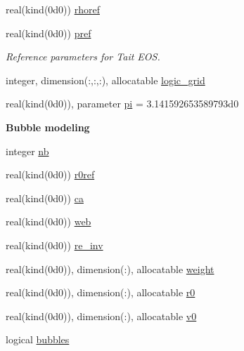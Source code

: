 \begin{DoxyCompactItemize}
real(kind(0d0)) \hyperlink{namespacem__global__parameters_a485a360d73013d7bce1daa01df404534}{rhoref}
\item 
real(kind(0d0)) \hyperlink{namespacem__global__parameters_aae2170af8a68c7dcdd91910aad867ef4}{pref}
\begin{DoxyCompactList}\small\item\em Reference parameters for Tait E\+OS. \end{DoxyCompactList}\item 
integer, dimension(\+:,\+:,\+:), allocatable \hyperlink{namespacem__global__parameters_adfaf902b37292b91750274e26989e8e6}{logic\+\_\+grid}
\item 
real(kind(0d0)), parameter \hyperlink{namespacem__global__parameters_a21765a90c01d221524670d1344b126cd}{pi} = 3.\+141592653589793d0
\end{DoxyCompactItemize}
\begin{Indent}\textbf{ Bubble modeling}\par
\begin{DoxyCompactItemize}
\item 
integer \hyperlink{namespacem__global__parameters_ad76c4758994b52559f478d251dc0cba5}{nb}
\item 
real(kind(0d0)) \hyperlink{namespacem__global__parameters_a24492f9b474683476a342e7ee42c1c6d}{r0ref}
\item 
real(kind(0d0)) \hyperlink{namespacem__global__parameters_a1fcd6cc13ad7f604ef81708716a1feac}{ca}
\item 
real(kind(0d0)) \hyperlink{namespacem__global__parameters_af2ed21959a90158c2459574230cdfcff}{web}
\item 
real(kind(0d0)) \hyperlink{namespacem__global__parameters_a4438313a11564fa911c586d2dee15b8d}{re\+\_\+inv}
\item 
real(kind(0d0)), dimension(\+:), allocatable \hyperlink{namespacem__global__parameters_a121ed97f0ae913d37bce5bbf1c7b2cc2}{weight}
\item 
real(kind(0d0)), dimension(\+:), allocatable \hyperlink{namespacem__global__parameters_a585a72037bbffe12e8d4512a57f52418}{r0}
\item 
real(kind(0d0)), dimension(\+:), allocatable \hyperlink{namespacem__global__parameters_a334b440356a4353d073c43e68c2372da}{v0}
\item 
logical \hyperlink{namespacem__global__parameters_a4a22ed160838f8fbe6bd506f334b8815}{bubbles}
\end{DoxyCompactItemize}
\end{Indent}
